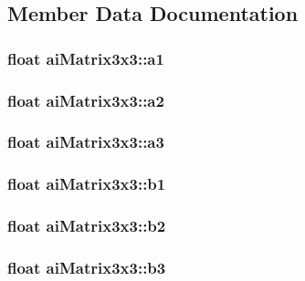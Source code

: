 \subsection{Member Data Documentation}
\hypertarget{structai_matrix3x3_a6884258a2f50758ed8b554b531186917}{
\subsubsection[{a1}]{\setlength{\rightskip}{0pt plus 5cm}float ai\-Matrix3x3\-::a1}}\label{structai_matrix3x3_a6884258a2f50758ed8b554b531186917}
\hypertarget{structai_matrix3x3_a4c74733870193040ba4953fb673e77df}{
\subsubsection[{a2}]{\setlength{\rightskip}{0pt plus 5cm}float ai\-Matrix3x3\-::a2}}\label{structai_matrix3x3_a4c74733870193040ba4953fb673e77df}
\hypertarget{structai_matrix3x3_a851d391df32a39e1ced1a9a286b38cf4}{
\subsubsection[{a3}]{\setlength{\rightskip}{0pt plus 5cm}float ai\-Matrix3x3\-::a3}}\label{structai_matrix3x3_a851d391df32a39e1ced1a9a286b38cf4}
\hypertarget{structai_matrix3x3_a9eeba340d3502017caad70416f03863a}{
\subsubsection[{b1}]{\setlength{\rightskip}{0pt plus 5cm}float ai\-Matrix3x3\-::b1}}\label{structai_matrix3x3_a9eeba340d3502017caad70416f03863a}
\hypertarget{structai_matrix3x3_a9f5e25b60bbd7bdf8f0a19cd82cc6b15}{
\subsubsection[{b2}]{\setlength{\rightskip}{0pt plus 5cm}float ai\-Matrix3x3\-::b2}}\label{structai_matrix3x3_a9f5e25b60bbd7bdf8f0a19cd82cc6b15}
\hypertarget{structai_matrix3x3_a21aa4345fe6ce2774db94d118c536d02}{
\subsubsection[{b3}]{\setlength{\rightskip}{0pt plus 5cm}float ai\-Matrix3x3\-::b3}}\label{structai_matrix3x3_a21aa4345fe6ce2774db94d118c536d02}
